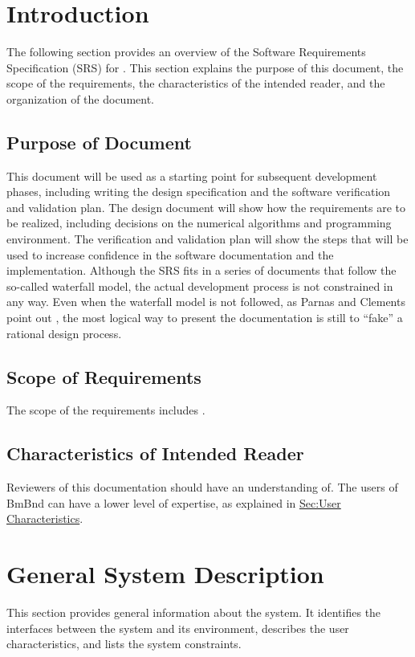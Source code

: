 \documentclass[12pt]{article}
\begin{document}
\section{Introduction}
\label{Sec:Intro}


The following section provides an overview of the Software Requirements Specification (SRS) for . This section explains the purpose of this document, the scope of the requirements, the characteristics of the intended reader, and the organization of the document.

\subsection{Purpose of Document}
\label{Sec:DocPurpose}
This document will be used as a starting point for subsequent development phases, including writing the design specification and the software verification and validation plan. The design document will show how the requirements are to be realized, including decisions on the numerical algorithms and programming environment. The verification and validation plan will show the steps that will be used to increase confidence in the software documentation and the implementation. Although the SRS fits in a series of documents that follow the so-called waterfall model, the actual development process is not constrained in any way. Even when the waterfall model is not followed, as Parnas and Clements point out \cite{parnasClements1986}, the most logical way to present the documentation is still to ``fake'' a rational design process.

\subsection{Scope of Requirements}
\label{Sec:ReqsScope}
The scope of the requirements includes .

\subsection{Characteristics of Intended Reader}
\label{Sec:ReaderChars}
Reviewers of this documentation should have an understanding of. The users of BmBnd can have a lower level of expertise, as explained in \hyperref[Sec:UserChars]{Sec:User Characteristics}.

\section{General System Description}
\label{Sec:GenSysDesc}
This section provides general information about the system. It identifies the interfaces between the system and its environment, describes the user characteristics, and lists the system constraints.
\end{document}
